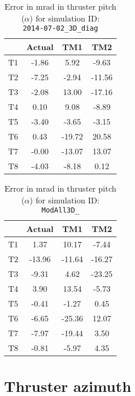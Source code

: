 \begin{table}[H]
\centering
\cprotect\caption{Error in mrad in thruster pitch ($\alpha$) for simulation ID:\\
\verb|2014-07-02_3D_diag|}
\begin{tabular}{|c|c|c|c|} \hline
~ & Actual & TM1 & TM2 \\ \hline
T1 & -1.86 & 5.92 & -9.63 \\
T2 & -7.25 & -2.94 & -11.56 \\
T3 & -2.08 & 13.00 & -17.16 \\
T4 & 0.10 & 9.08 & -8.89 \\
T5 & -3.40 & -3.65 & -3.15 \\
T6 & 0.43 & -19.72 & 20.58 \\
T7 & -0.00 & -13.07 & 13.07 \\
T8 & -4.03 & -8.18 & 0.12 \\ \hline
\end{tabular}
\label{alpha-6}
\end{table}

\begin{table}[H]
\centering
\cprotect\caption{Error in mrad in thruster pitch ($\alpha$) for simulation ID:\\
\verb|ModAll3D_|}
\begin{tabular}{|c|c|c|c|} \hline
~ & Actual & TM1 & TM2 \\ \hline
T1 & 1.37 & 10.17 & -7.44 \\
T2 & -13.96 & -11.64 & -16.27 \\
T3 & -9.31 & 4.62 & -23.25 \\
T4 & 3.90 & 13.54 & -5.73 \\
T5 & -0.41 & -1.27 & 0.45 \\
T6 & -6.65 & -25.36 & 12.07 \\
T7 & -7.97 & -19.44 & 3.50 \\
T8 & -0.81 & -5.97 & 4.35 \\ \hline
\end{tabular}
\label{alpha-7}
\end{table}
\newpage
\section*{Thruster azimuth}


